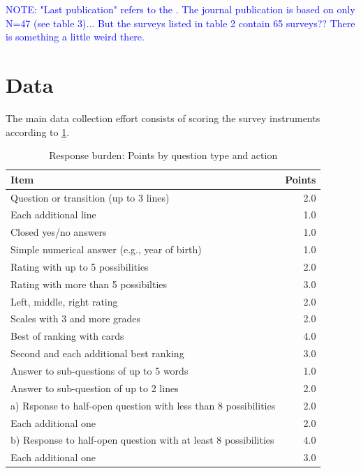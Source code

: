 \documentclass[a4paper]{article}\usepackage[]{graphicx}\usepackage[]{xcolor}
\newcommand{\note}[1]{\textcolor{blue}{NOTE: #1}}
\begin{document}
\note{"Last publication" refers to the \citet{axhausen2019predicting}. The journal publication \citep{schmid2019predicting} is based on only N=47 (see table 3)... But the surveys listed in table 2 contain 65 surveys?? There is something a little weird there.}

\section{Data}

The main data collection effort consists of scoring the survey instruments according to \cref{tab:response_burden_scheme}.



\begin{table}

\caption{\label{tab:response_burden_scheme}Response burden: Points by question type and action}
\centering
\begin{tabular}[t]{lr}
\toprule
Item & Points\\
\midrule
Question or transition (up to 3 lines) & 2.0\\
\hspace{2em}Each additional line & 1.0\\
Closed yes/no answers & 1.0\\
Simple numerical answer (e.g., year of birth) & 1.0\\
Rating with up to 5 possibilities & 2.0\\
\addlinespace
Rating with more than 5 possibilties & 3.0\\
Left, middle, right rating & 2.0\\
Scales with 3 and more grades & 2.0\\
Best of ranking with cards & 4.0\\
\hspace{2em}Second and each additional best ranking & 3.0\\
\addlinespace
Answer to sub-questions of up to 5 words & 1.0\\
Answer to sub-question of up to 2 lines & 2.0\\
a) Rsponse to half-open question with less than 8 possibilities & 2.0\\
\hspace{2em}Each additional one & 2.0\\
b) Response to half-open question with at least 8 possibilities & 4.0\\
\addlinespace
\hspace{2em}Each additional one & 3.0\\

\end{tabular}
\end{table}
\end{document}
